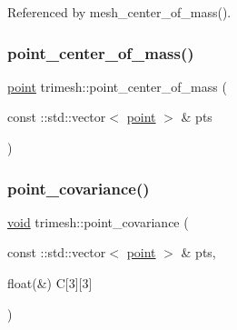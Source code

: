 Referenced by mesh\+\_\+center\+\_\+of\+\_\+mass().

\mbox{\label{namespacetrimesh_a93a754d2dc9fbf362b8ae136c7c818f0}} 
\subsubsection{\texorpdfstring{point\+\_\+center\+\_\+of\+\_\+mass()}{point\_center\_of\_mass()}\hspace{0.1cm}{\footnotesize\ttfamily [2/2]}}
{\footnotesize\ttfamily \hyperlink{namespacetrimesh_a325b99fd6454b22fa4c4bc3223271b2c}{point} trimesh\+::point\+\_\+center\+\_\+of\+\_\+mass (\begin{DoxyParamCaption}\item[{const \+::std\+::vector$<$ \hyperlink{namespacetrimesh_a325b99fd6454b22fa4c4bc3223271b2c}{point} $>$ \&}]{pts }\end{DoxyParamCaption})}

\mbox{\label{namespacetrimesh_a96ebf4e1f7c1e0006873a4cd655d3342}} 
\subsubsection{\texorpdfstring{point\+\_\+covariance()}{point\_covariance()}\hspace{0.1cm}{\footnotesize\ttfamily [1/2]}}
{\footnotesize\ttfamily \hyperlink{namespacetrimesh_a784ddfd979e1c579bda795a8edfc3f43}{void} trimesh\+::point\+\_\+covariance (\begin{DoxyParamCaption}\item[{const \+::std\+::vector$<$ \hyperlink{namespacetrimesh_a325b99fd6454b22fa4c4bc3223271b2c}{point} $>$ \&}]{pts,  }\item[{float(\&)}]{C\mbox{[}3\mbox{]}\mbox{[}3\mbox{]} }\end{DoxyParamCaption})}

\mbox{\label{namespacetrimesh_a86cb4656d1d912b5cf53f5d46ef96a0d}} 
